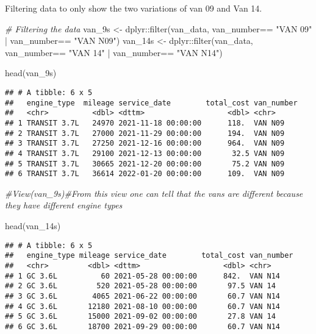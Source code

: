 \documentclass[
]{article}
\newenvironment{Shaded}{\begin{snugshade}}{\end{snugshade}}
\newcommand{\CommentTok}[1]{\textcolor[rgb]{0.56,0.35,0.01}{\textit{#1}}}
\newcommand{\FunctionTok}[1]{\textcolor[rgb]{0.00,0.00,0.00}{#1}}
\newcommand{\NormalTok}[1]{#1}
\newcommand{\OtherTok}[1]{\textcolor[rgb]{0.56,0.35,0.01}{#1}}
\newcommand{\SpecialCharTok}[1]{\textcolor[rgb]{0.00,0.00,0.00}{#1}}
\newcommand{\StringTok}[1]{\textcolor[rgb]{0.31,0.60,0.02}{#1}}
\begin{document}
Filtering data to only show the two variations of van 09 and Van 14.

\begin{Shaded}
\begin{Highlighting}[]
 \CommentTok{\# Filtering the data}
\NormalTok{van\_9s }\OtherTok{\textless{}{-}}\NormalTok{ dplyr}\SpecialCharTok{::}\FunctionTok{filter}\NormalTok{(van\_data, van\_number}\SpecialCharTok{==} \StringTok{"VAN 09"} \SpecialCharTok{|}\NormalTok{ van\_number}\SpecialCharTok{==} \StringTok{"VAN N09"}\NormalTok{)}
\NormalTok{van\_14s }\OtherTok{\textless{}{-}}\NormalTok{ dplyr}\SpecialCharTok{::}\FunctionTok{filter}\NormalTok{(van\_data, van\_number}\SpecialCharTok{==} \StringTok{"VAN 14"} \SpecialCharTok{|}\NormalTok{ van\_number}\SpecialCharTok{==} \StringTok{"VAN N14"}\NormalTok{)}

\FunctionTok{head}\NormalTok{(van\_9s)}
\end{Highlighting}
\end{Shaded}

\begin{verbatim}
## # A tibble: 6 x 5
##   engine_type  mileage service_date        total_cost van_number
##   <chr>          <dbl> <dttm>                   <dbl> <chr>     
## 1 TRANSIT 3.7L   24970 2021-11-18 00:00:00      118.  VAN N09   
## 2 TRANSIT 3.7L   27000 2021-11-29 00:00:00      194.  VAN N09   
## 3 TRANSIT 3.7L   27250 2021-12-16 00:00:00      964.  VAN N09   
## 4 TRANSIT 3.7L   29100 2021-12-13 00:00:00       32.5 VAN N09   
## 5 TRANSIT 3.7L   30665 2021-12-20 00:00:00       75.2 VAN N09   
## 6 TRANSIT 3.7L   36614 2022-01-20 00:00:00      109.  VAN N09
\end{verbatim}

\begin{Shaded}
\begin{Highlighting}[]
\CommentTok{\#View(van\_9s)\#From this view one can tell that the vans are different because they have different engine types }

\FunctionTok{head}\NormalTok{(van\_14s)}
\end{Highlighting}
\end{Shaded}

\begin{verbatim}
## # A tibble: 6 x 5
##   engine_type mileage service_date        total_cost van_number
##   <chr>         <dbl> <dttm>                   <dbl> <chr>     
## 1 GC 3.6L          60 2021-05-28 00:00:00      842.  VAN N14   
## 2 GC 3.6L         520 2021-05-28 00:00:00       97.5 VAN 14    
## 3 GC 3.6L        4065 2021-06-22 00:00:00       60.7 VAN N14   
## 4 GC 3.6L       12180 2021-08-10 00:00:00       60.7 VAN N14   
## 5 GC 3.6L       15000 2021-09-02 00:00:00       27.8 VAN 14    
## 6 GC 3.6L       18700 2021-09-29 00:00:00       60.7 VAN N14
\end{verbatim}
\end{document}
